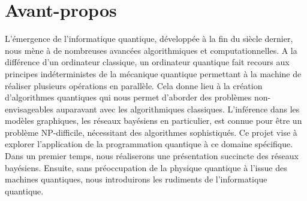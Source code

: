 \section*{Avant-propos}

L’émergence de l’informatique quantique, développée à la fin du siècle dernier, nous mène à de nombreuses avancées algorithmiques et computationnelles. A la différence d’un ordinateur classique, un ordinateur quantique fait recours aux principes indéterministes de la mécanique quantique permettant à la machine de réaliser plusieurs opérations en parallèle. 
Cela donne lieu à la création d'algorithmes quantiques qui nous permet d’aborder des problèmes non-envisageables auparavant avec les algorithmiques classiques. 
L’inférence dans les modèles graphiques, les réseaux bayésiens en particulier, est connue pour être un problème NP-difficile, nécessitant des algorithmes sophistiqués. Ce projet vise à explorer l’application de la programmation quantique à ce domaine spécifique.
\\
Dans un premier temps, nous réaliserons une présentation succincte des réseaux bayésiens. Ensuite, sans préoccupation de la physique quantique à l’issue des machines quantiques, nous introduirons les rudiments de l’informatique quantique. 